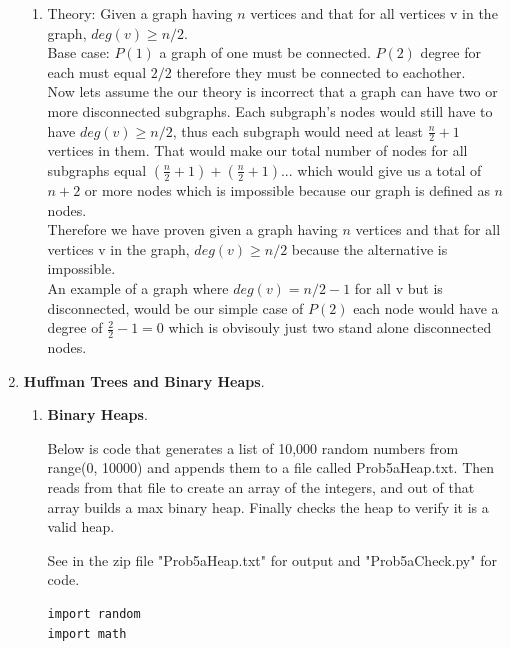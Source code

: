 \documentclass{article}
\begin{document}
\begin{enumerate}
\begin{enumerate}
      \item Theory: Given a graph having $n$ vertices and that for all vertices v in the graph, $deg(v) \geq n/2$.\\
      
      Base case: $P(1)$ a graph of one must be connected. $P(2)$ degree for each must equal $2/2$ therefore they must be connected to eachother.\\

      Now lets assume the our theory is incorrect that a graph can have two or more disconnected subgraphs. Each subgraph's nodes would still have to have $deg(v) \geq n/2$, thus each subgraph would need at least $\frac{n}{2} + 1$ vertices in them.
      That would make our total number of nodes for all subgraphs equal $(\frac{n}{2} + 1) + (\frac{n}{2} + 1) ...$ which would give us a total of $n + 2$ or more nodes which is impossible because our graph is defined as $n$ nodes.\\

      Therefore we have proven given a graph having $n$ vertices and that for all vertices v in the graph, $deg(v) \geq n/2$ because the alternative is impossible.\\

      An example of a graph where $deg(v) = n/2 -1$ for all v but is disconnected, would be our simple case of $P(2)$ each node would have a degree of $\frac{2}{2} - 1 = 0$ which is obvisouly just two stand alone disconnected nodes.
    \end{enumerate}

    \item \textbf{Huffman Trees and Binary Heaps}.
    
    \begin{enumerate}
      
      \item \textbf{Binary Heaps}.
  
        Below is code that generates a list of 10,000 random numbers from range(0, 10000) and appends them to a file called Prob5aHeap.txt. 
        Then reads from that file to create an array of the integers, and out of that array builds a max binary heap. 
        Finally checks the heap to verify it is a valid heap.

        See in the zip file "Prob5aHeap.txt" for output and "Prob5aCheck.py" for code.

        \begin{lstlisting}
import random
import math     


\end{lstlisting}
\end{enumerate}
\end{enumerate}
\end{document}
